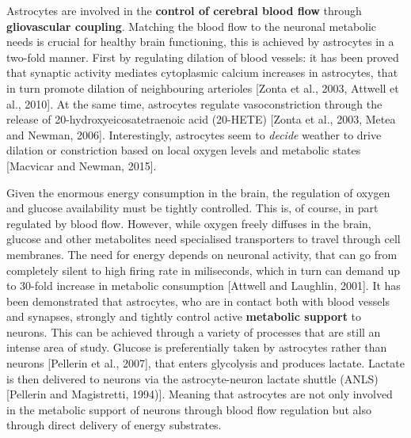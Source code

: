 Astrocytes are involved in the \textbf{control of cerebral blood flow} through \textbf{gliovascular coupling}.
Matching the blood flow to the neuronal metabolic needs is crucial for healthy brain functioning, this is achieved by astrocytes in a two-fold manner. 
First by regulating dilation of blood vessels: it has been proved that synaptic activity mediates cytoplasmic calcium increases in astrocytes, that in turn promote dilation of neighbouring arterioles [Zonta et al., 2003, Attwell et al., 2010].
At the same time, astrocytes regulate vasoconstriction through the release of 20-hydroxyeicosatetraenoic acid (20-HETE) [Zonta et al., 2003, Metea and Newman, 2006].
Interestingly, astrocytes seem to \textit{decide} weather to drive dilation or constriction based on local oxygen levels and metabolic states [Macvicar and Newman, 2015]. 

Given the enormous energy consumption in the brain, the regulation of oxygen and glucose availability must be tightly controlled.
This is, of course, in part regulated by blood flow. However, while oxygen freely diffuses in the brain, glucose and other metabolites need specialised transporters to travel through cell membranes.
The need for energy depends on neuronal activity, that can go from completely silent to high firing rate in miliseconds, which in turn can demand up to 30-fold increase in metabolic consumption [Attwell and Laughlin, 2001]. 
It has been demonstrated that astrocytes, who are in contact both with blood vessels and synapses, strongly and tightly control active \textbf{metabolic support} to neurons. 
This can be achieved through a variety of processes that are still an intense area of study. 
Glucose is preferentially taken by astrocytes rather than neurons [Pellerin et al., 2007], that enters glycolysis and produces lactate.
Lactate is then delivered to neurons via the astrocyte-neuron lactate shuttle (ANLS) [Pellerin and Magistretti, 1994)]. 
Meaning that astrocytes are not only involved in the metabolic support of neurons through blood flow regulation but also through direct delivery of energy substrates. 

